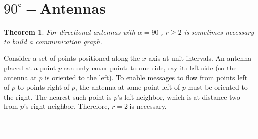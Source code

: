 \documentclass[11pt]{article}
\newtheorem{theorem}{Theorem}
\newcommand{\qed}{\rule{0.5em}{1.5ex}}
\newcommand{\fqed}{{\hfill~\qed}}
\newenvironment{proof}{{\noindent \bf Proof.}}
                      {{\hfill \fqed} \vspace{1em}}
\begin{document}
\section{$90^\circ-$Antennas}
\label{sec:90}

\begin{theorem}
For directional antennas with $\alpha = 90^\circ$, $r \geq 2$ is
sometimes necessary to build a communication graph.
\end{theorem}
\begin{proof}
Consider a set of points positioned along the $x$-axis
at unit intervals.
An antenna placed at a point $p$ can only cover points to one side,
say its left side (so the antenna at $p$ is oriented to the left).
To enable messages to flow from points left of $p$ to points
right of $p$, the antenna at some point left of $p$ must be oriented
to the right. The nearest such point is $p$'s left neighbor, which
is at distance two from $p$'s right neighbor.
Therefore, $r = 2$ is necessary.
\end{proof}
\end{document}
